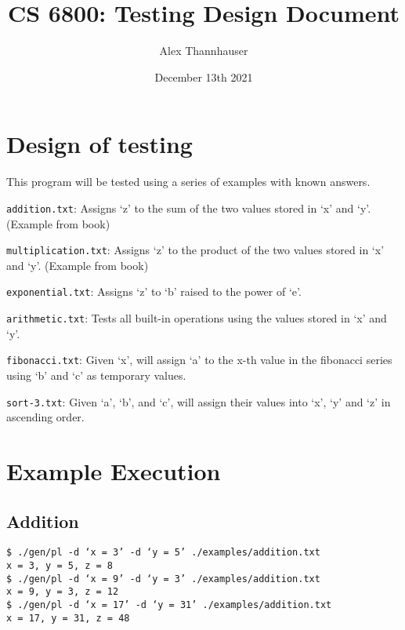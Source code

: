 \documentclass[letterpaper,11pt]{article}
\begin{document}
{
	\title{CS 6800: Testing Design Document}
	\author{Alex Thannhauser}
	\date{December 13th 2021}

	\maketitle
	
	\section{Design of testing}
	{
		This program will be tested using a series of examples
		with known answers.
		\begin{itemize}
		{
			\item \texttt{addition.txt}: Assigns `z' to the sum of the two
				values stored in `x' and `y'. (Example from book) 
				
			\item \texttt{multiplication.txt}: Assigns `z' to the product of the two
				values stored in `x' and `y'. (Example from book) 
			
			\item \texttt{exponential.txt}: Assigns `z' to `b' raised to the
				power of `e'.
			
			\item \texttt{arithmetic.txt}: Tests all built-in operations using
				the values stored in `x' and `y'.
				
			\item \texttt{fibonacci.txt}: Given `x', will assign `a' to the x-th
				value in the fibonacci series using `b' and `c' as temporary
				values.
			
			\item \texttt{sort-3.txt}: Given `a', `b', and `c', will assign their
				values into `x', `y' and `z' in ascending order.
		}
		\end{itemize}
	}
	
	\section {Example Execution}
	{
		\subsection {Addition}
		{
			\texttt{\$ ./gen/pl -d `x = 3' -d `y = 5' ./examples/addition.txt}\\
			\texttt{x = 3, y = 5, z = 8}\\
			\texttt{\$ ./gen/pl -d `x = 9' -d `y = 3' ./examples/addition.txt}\\
			\texttt{x = 9, y = 3, z = 12}\\
			\texttt{\$ ./gen/pl -d `x = 17' -d `y = 31' ./examples/addition.txt}\\
			\texttt{x = 17, y = 31, z = 48}\\
		}
		
}}
\end{document}

